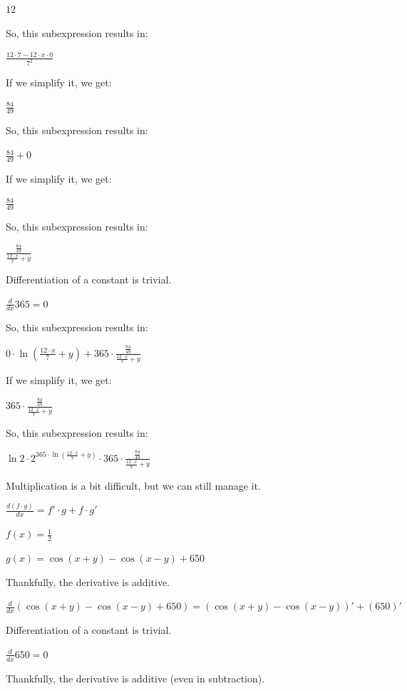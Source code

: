 \documentclass[12pt]{article}
\begin{document}
\begin{fleqn}[\parindent]
$  12  $\par
So, this subexpression results in:\par
$ \frac{ 12  \cdot  7  -  12  \cdot  x  \cdot  0 }{{ 7 }^{ 2 }} $\par
If we simplify it, we get:\par
$ \frac{ 84 }{ 49 } $\par
So, this subexpression results in:\par
$ \frac{ 84 }{ 49 } +  0  $\par
If we simplify it, we get:\par
$ \frac{ 84 }{ 49 } $\par
So, this subexpression results in:\par
$ \frac{\frac{ 84 }{ 49 }}{\frac{ 12  \cdot  x }{ 7 } +  y } $\par
Differentiation of a constant is trivial.\par
$ \frac{d}{dx} 365 = 0 $\par
So, this subexpression results in:\par
$  0  \cdot \ln (\frac{ 12  \cdot  x }{ 7 } +  y ) +  365  \cdot \frac{\frac{ 84 }{ 49 }}{\frac{ 12  \cdot  x }{ 7 } +  y } $\par
If we simplify it, we get:\par
$  365  \cdot \frac{\frac{ 84 }{ 49 }}{\frac{ 12  \cdot  x }{ 7 } +  y } $\par
So, this subexpression results in:\par
$ \ln  2  \cdot { 2 }^{ 365  \cdot \ln (\frac{ 12  \cdot  x }{ 7 } +  y )} \cdot  365  \cdot \frac{\frac{ 84 }{ 49 }}{\frac{ 12  \cdot  x }{ 7 } +  y } $\par
Multiplication is a bit difficult, but we can still manage it.\par
$ \frac{d (f \cdot g)}{dx} = f' \cdot g + f \cdot g' $\par
$ f(x) = \frac{ 1 }{ 2 } $\par
$ g(x) = \cos ( x  +  y ) - \cos ( x  -  y ) +  650  $\par
Thankfully, the derivative is additive.\par
$ \frac{d}{dx} (\cos ( x  +  y ) - \cos ( x  -  y ) +  650 ) = (\cos ( x  +  y ) - \cos ( x  -  y ))' + ( 650 )' $\par
Differentiation of a constant is trivial.\par
$ \frac{d}{dx} 650 = 0 $\par
Thankfully, the derivative is additive (even in subtraction).\par

\end{fleqn}
\end{document}
